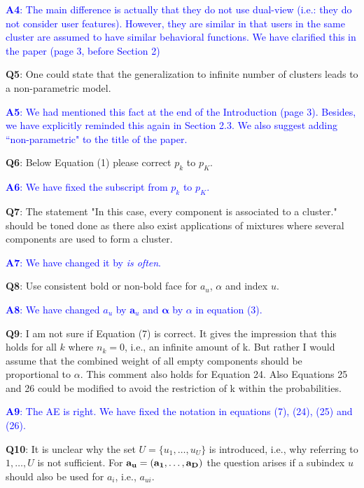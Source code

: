 \documentclass[]{article}
\begin{document}
	\textcolor{blue}{  
	\textbf{A4}:  The main difference is actually that they do not use dual-view (i.e.: they do not consider user features). However, they are similar in that users in the same cluster are assumed to have similar behavioral functions. We have clarified this in the paper (page 3, before Section 2)
	} 
	
		\vspace{3mm}
	\textbf{Q5}:  One could state that the generalization to infinite number of clusters leads to a non-parametric model.

	\textcolor{blue}{  
	\textbf{A5}: We had mentioned this fact at the end of the Introduction (page 3). Besides, we have explicitly reminded this again in Section 2.3. We also suggest adding ``non-parametric" to the title of the paper.
	} 

		\vspace{3mm}
	\textbf{Q6}:  Below Equation (1) please correct $p_k$ to $p_K$.

	\textcolor{blue}{  
	\textbf{A6}: We have fixed the subscript from $p_k$ to $p_K$.
	} 

		\vspace{3mm}
	\textbf{Q7}:  The statement "In this case, every component is associated to a cluster." should be toned done as there also exist applications of mixtures where several components are used to form a cluster.
	
	\textcolor{blue}{  
	\textbf{A7}: We have changed it by \textit{is often}.
	} 
	
		\vspace{3mm}
	\textbf{Q8}:  Use consistent bold or non-bold face for $a_u$, $\alpha$ and index $u$.

	\textcolor{blue}{  
	\textbf{A8}: We have changed $a_u$ by $\mathbf{a}_u$ and $\boldsymbol{\alpha}$ by $\alpha$ in equation (3).
	} 
	
		\vspace{3mm}
	\textbf{Q9}: I am not sure if Equation (7) is correct. It gives the impression that this holds for all $k$ where $n_k = 0$, i.e., an infinite amount of k. But rather I would assume that the combined weight of all empty components should be proportional to $\alpha$. This comment also holds for Equation 24. Also Equations 25 and 26 could be modified to avoid the restriction of k within the probabilities.

	\textcolor{blue}{  
	\textbf{A9}: The AE is right. We have fixed the notation in equations (7), (24), (25) and (26).
	} 

	
	\vspace{3mm}
	\textbf{Q10}:  It is unclear why the set $U = \{u_1, \ldots, u_U\}$ is introduced, i.e., why referring to $1, \ldots, U$ is not sufficient. For $\bf{a}_u = (a_1, \ldots, a_D)$ the question arises if a subindex $u$ should also be used for $a_i$, i.e., $a_{ui}$.
\end{document}
